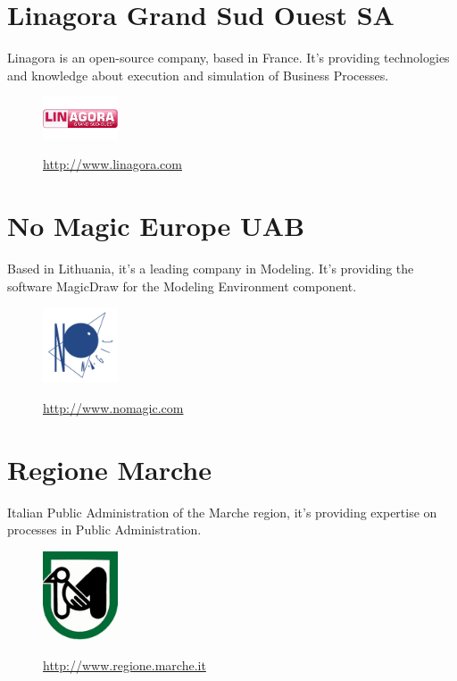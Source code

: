 \documentclass{learnpad}
\begin{document}
\section{Linagora Grand Sud Ouest SA}
Linagora is an open-source company, based in France.  It's providing
technologies and knowledge about execution and simulation of Business Processes.

\begin{figure}[!htp]
	\centering
	\includegraphics[width=6em,keepaspectratio]{figures/linagora.png}\par
	\url{http://www.linagora.com}
\end{figure}

\section{No Magic Europe UAB}
Based in Lithuania, it's a leading company in Modeling.  It's providing the
software MagicDraw for the Modeling Environment component.

\begin{figure}[!htp]
	\centering
	\includegraphics[width=6em,keepaspectratio]{figures/nme.png}\par
	\url{http://www.nomagic.com}
\end{figure}

\section{Regione Marche}
Italian Public Administration of the Marche region, it's providing expertise on
processes in Public Administration.

\begin{figure}[!htp]
	\centering
	\includegraphics[width=6em,keepaspectratio]{figures/marche.jpg}\par
	\url{http://www.regione.marche.it}
\end{figure}
\end{document}

